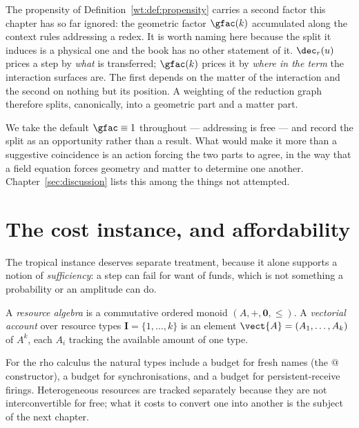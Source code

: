 \begin{remark}
\label{rmk:geomatter}
The propensity of Definition~\ref{wt:def:propensity} carries a second
factor this chapter has so far ignored: the geometric factor
$\gfac(k)$ accumulated along the context rules addressing a redex.  It is
worth naming here because the split it induces is a physical one and the
book has no other statement of it.  $\dec_r(u)$ prices a step by
\emph{what} is transferred; $\gfac(k)$ prices it by \emph{where in the
term} the interaction surfaces are.  The first depends on the matter of
the interaction and the second on nothing but its position.  A weighting
of the reduction graph therefore splits, canonically, into a geometric
part and a matter part.

We take the default $\gfac \equiv 1$ throughout --- addressing is free ---
and record the split as an opportunity rather than a result.  What would
make it more than a suggestive coincidence is an action forcing the two
parts to agree, in the way that a field equation forces geometry and
matter to determine one another.  Chapter~\ref{sec:discussion} lists
this among the things not attempted.
\end{remark}

\section{The cost instance, and affordability}

The tropical instance deserves separate treatment, because it alone
supports a notion of \emph{sufficiency}: a step can fail for want of
funds, which is not something a probability or an amplitude can do.

\begin{definition}
A \emph{resource algebra} is a commutative ordered monoid
$(A, +, \mathbf{0}, \leq)$.  A \emph{vectorial account} over resource
types $\mathbf{I} = \{1,\ldots,k\}$ is an element
$\vect{A} = (A_1,\ldots,A_k)$ of $A^k$, each $A_i$ tracking the available
amount of one type.
\end{definition}

For the rho calculus the natural types include a budget for fresh names
(the $@$ constructor), a budget for synchronisations, and a budget for
persistent-receive firings.  Heterogeneous resources are tracked
separately because they are not interconvertible for free; what it costs
to convert one into another is the subject of the next chapter.

